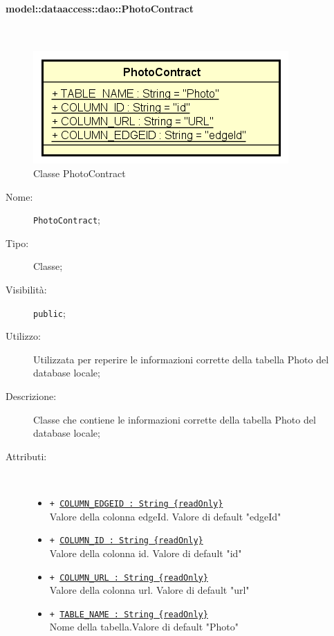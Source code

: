 \documentclass[../DefinizioneDiProdotto.tex]{subfiles}
\begin{document}
\paragraph{model::dataaccess::dao::PhotoContract}
\
\begin{figure}[H]
	\centering
	\includegraphics[width=\maxwidth]{img/PhotoContract.png}
	\caption{Classe PhotoContract}\label{fig:model::dataaccess::dao::PhotoContract} 
\end{figure}
\begin{description}
	\item[Nome:] \texttt{PhotoContract};
	\item[Tipo:] Classe;
	\item[Visibilità:] \texttt{public};
	\item[Utilizzo:] Utilizzata per reperire le informazioni corrette della tabella Photo del database locale;
	\item[Descrizione:] Classe che contiene le informazioni corrette della tabella Photo del database locale;
	\item[Attributi:] \
	\begin{itemize}
		\item \texttt{+ \underline{COLUMN\_EDGEID : String \{readOnly\}}}\\
		Valore della colonna edgeId. Valore di default "edgeId"
		
		\item \texttt{+ \underline{COLUMN\_ID : String \{readOnly\}}}\\
		Valore della colonna id. Valore di default "id"
		
		\item \texttt{+ \underline{COLUMN\_URL : String \{readOnly\}}}\\
		Valore della colonna url. Valore di default "url"
		
		\item \texttt{+ \underline{TABLE\_NAME : String \{readOnly\}}}\\
		Nome della tabella.Valore di default "Photo"
		
	\end{itemize}
\end{description}
\end{document}
